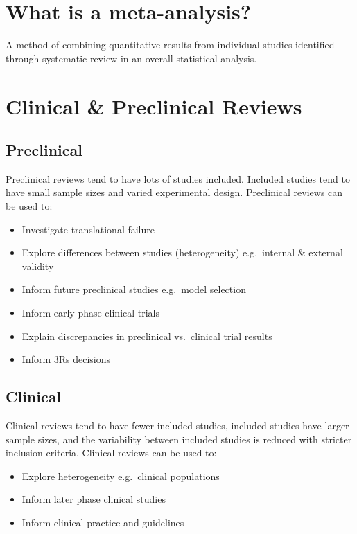 \documentclass[
]{book}
\providecommand{\tightlist}{%
  \setlength{\itemsep}{0pt}\setlength{\parskip}{0pt}}
\begin{document}
\hypertarget{what-is-a-meta-analysis}{%
\section{What is a meta-analysis?}\label{what-is-a-meta-analysis}}

A method of combining quantitative results from individual studies identified through systematic review in an overall statistical analysis.

\hypertarget{clinical-preclinical-reviews}{%
\section{Clinical \& Preclinical Reviews}\label{clinical-preclinical-reviews}}

\hypertarget{preclinical}{%
\subsection{Preclinical}\label{preclinical}}

Preclinical reviews tend to have lots of studies included. Included studies tend to have small sample sizes and varied experimental design.
Preclinical reviews can be used to:

\begin{itemize}
\tightlist
\item
  Investigate translational failure
\item
  Explore differences between studies (heterogeneity) e.g.~internal \& external validity
\item
  Inform future preclinical studies e.g.~model selection
\item
  Inform early phase clinical trials
\item
  Explain discrepancies in preclinical vs.~clinical trial results
\item
  Inform 3Rs decisions
\end{itemize}

\hypertarget{clinical}{%
\subsection{Clinical}\label{clinical}}

Clinical reviews tend to have fewer included studies, included studies have larger sample sizes, and the variability between included studies is reduced with stricter inclusion criteria.
Clinical reviews can be used to:

\begin{itemize}
\tightlist
\item
  Explore heterogeneity e.g.~clinical populations
\item
  Inform later phase clinical studies
\item
  Inform clinical practice and guidelines
\end{itemize}
\end{document}
